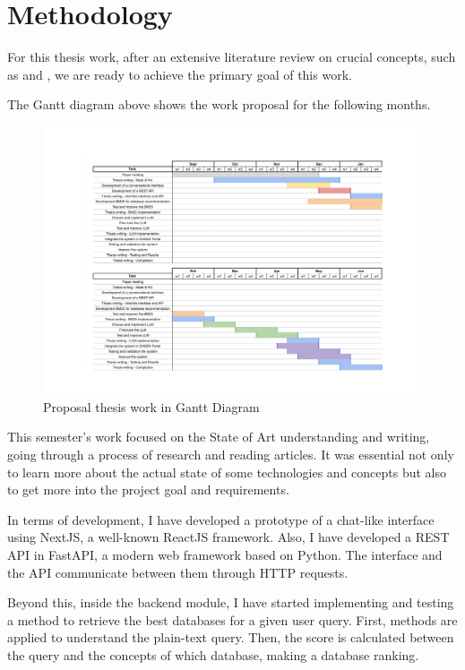\chapter{Methodology}
\label{chapter:Methodology}

For this thesis work, after an extensive literature review on crucial concepts, such as {\ir} and {\llm}, we are ready to achieve the primary goal of this work.

The Gantt diagram above shows the work proposal for the following months. 

\begin{figure}[ht]
    \includegraphics[width=16cm]{figs/chapter3/diagram_gantt.png}
    \centering
    \caption{Proposal thesis work in Gantt Diagram}
\end{figure}

This semester's work focused on the State of Art understanding and writing, going through a process of research and reading articles. It was essential not only to learn more about the actual state of some technologies and concepts but also to get more into the project goal and requirements.

In terms of development, I have developed a prototype of a chat-like interface using NextJS, a well-known ReactJS framework. Also, I have developed a REST API in FastAPI, a modern web framework based on Python. The interface and the API communicate between them through HTTP requests.

Beyond this, inside the backend module, I have started implementing and testing a {\bm} method to retrieve the best databases for a given user query. First, {\nlp} methods are applied to understand the plain-text query. Then, the {\bm} score is calculated between the query and the concepts of which database, making a database ranking.
 
